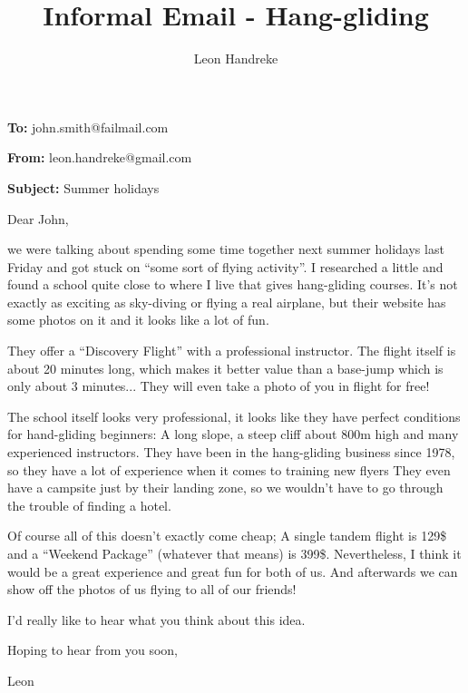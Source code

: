 \documentclass[10pt]{article}
\title{Informal Email - Hang-gliding}
\author{Leon Handreke}
\date{}                                           %
\begin{document}
\onehalfspacing

\maketitle
{}\selectfont

\textbf{To:} john.smith@failmail.com

\textbf{From:} leon.handreke@gmail.com

\textbf{Subject:} Summer holidays

Dear John,

we were talking about spending some time together next summer holidays last Friday and got stuck on ``some sort of flying activity''. I researched a little and found a school quite close to where I live that gives hang-gliding courses. It's not exactly as exciting as sky-diving or flying a real airplane, but their website has some photos on it and it looks like a lot of fun.

They offer a ``Discovery Flight'' with a professional instructor. The flight itself is about 20 minutes long, which makes it better value than a base-jump which is only about 3 minutes... They will even take a photo of you in flight for free!

The school itself looks very professional, it looks like they have perfect conditions for hand-gliding beginners: A long slope, a steep cliff about 800m high and many experienced instructors. They have been in the hang-gliding business since 1978, so they have a lot of experience when it comes to training new flyers They even have a campsite just by their landing zone, so we wouldn't have to go through the trouble of finding a hotel.

Of course all of this doesn't exactly come cheap; A single tandem flight is 129\$ and a ``Weekend Package'' (whatever that means) is 399\$. Nevertheless, I think it would be a great experience and great fun for both of us. And afterwards we can show off the photos of us flying to all of our friends!

I'd really like to hear what you think about this idea.

Hoping to hear from you soon,

Leon
\end{document}
